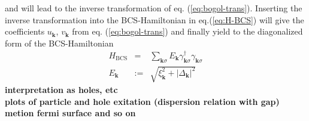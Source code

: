 and will lead to the inverse transformation of eq. (\ref{eq:bogol-trans}). Inserting the inverse transformation into the BCS-Hamiltonian in eq.(\ref{eq:H-BCS}) will give the coefficients $u_{\mathbf{k}}$, $v_{\mathbf{k}}$ from eq. (\ref{eq:bogol-trans}) and finally yield to the diagonalized form of the BCS-Hamiltonian
\begin{eqnarray}
H_{\text{BCS}} &=&  \sum_{ \mathbf{k} \sigma } E_{ \mathbf{k} } \gamma^{\dagger}_{\mathbf{k} \sigma } \gamma_{\mathbf{k} \sigma }\\
E_{\mathbf{k}} &:=&  \sqrt{\xi^2_{\mathbf{k}}  + |\Delta_{\mathbf{k}}|^2 }
\end{eqnarray}
\textbf{interpretation as holes, etc \\
plots of particle and hole exitation (dispersion relation with gap)\\
metion fermi surface and so on} \\

